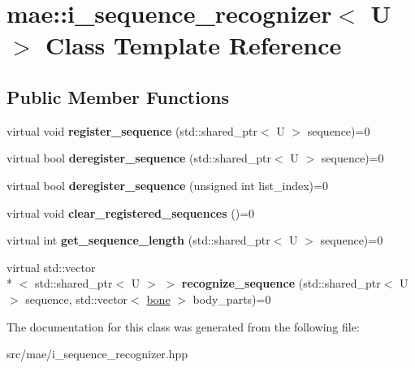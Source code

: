 \hypertarget{classmae_1_1i__sequence__recognizer}{\section{mae\-:\-:i\-\_\-sequence\-\_\-recognizer$<$ U $>$ Class Template Reference}
\label{classmae_1_1i__sequence__recognizer}
}
\subsection*{Public Member Functions}
\begin{DoxyCompactItemize}
\item 
\hypertarget{classmae_1_1i__sequence__recognizer_ac3e87eabdeec0e8cd9d083d1cb67274f}{virtual void {\bfseries register\-\_\-sequence} (std\-::shared\-\_\-ptr$<$ U $>$ sequence)=0}\label{classmae_1_1i__sequence__recognizer_ac3e87eabdeec0e8cd9d083d1cb67274f}

\item 
\hypertarget{classmae_1_1i__sequence__recognizer_a23681e6e91a56a02db5942869e3bb57b}{virtual bool {\bfseries deregister\-\_\-sequence} (std\-::shared\-\_\-ptr$<$ U $>$ sequence)=0}\label{classmae_1_1i__sequence__recognizer_a23681e6e91a56a02db5942869e3bb57b}

\item 
\hypertarget{classmae_1_1i__sequence__recognizer_a3c809ed240ff511a881efe38a6f174d8}{virtual bool {\bfseries deregister\-\_\-sequence} (unsigned int list\-\_\-index)=0}\label{classmae_1_1i__sequence__recognizer_a3c809ed240ff511a881efe38a6f174d8}

\item 
\hypertarget{classmae_1_1i__sequence__recognizer_a19a8b974b8920c64508ae13d91662366}{virtual void {\bfseries clear\-\_\-registered\-\_\-sequences} ()=0}\label{classmae_1_1i__sequence__recognizer_a19a8b974b8920c64508ae13d91662366}

\item 
\hypertarget{classmae_1_1i__sequence__recognizer_aeed1cb575ad382406f5b2e30aa553a6c}{virtual int {\bfseries get\-\_\-sequence\-\_\-length} (std\-::shared\-\_\-ptr$<$ U $>$ sequence)=0}\label{classmae_1_1i__sequence__recognizer_aeed1cb575ad382406f5b2e30aa553a6c}

\item 
\hypertarget{classmae_1_1i__sequence__recognizer_a75078a38eb028e343195505fc6c1e9dd}{virtual std\-::vector\\*
$<$ std\-::shared\-\_\-ptr$<$ U $>$ $>$ {\bfseries recognize\-\_\-sequence} (std\-::shared\-\_\-ptr$<$ U $>$ sequence, std\-::vector$<$ \hyperlink{classmae_1_1bone}{bone} $>$ body\-\_\-parts)=0}\label{classmae_1_1i__sequence__recognizer_a75078a38eb028e343195505fc6c1e9dd}

\end{DoxyCompactItemize}


The documentation for this class was generated from the following file\-:\begin{DoxyCompactItemize}
\item 
src/mae/i\-\_\-sequence\-\_\-recognizer.\-hpp\end{DoxyCompactItemize}
